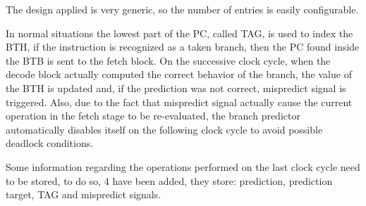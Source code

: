 \documentclass[12pt]{article}
\begin{document}
The design applied is very generic, so the number of entries is easily configurable.

In normal situations the lowest part of the PC, called TAG, is used to index the BTH, if the instruction is recognized as a taken branch, then the PC found inside the BTB is sent to the fetch block. On the successive clock cycle, when the decode block actually computed the correct behavior of the branch, the value of the BTH is updated and, if the prediction was not correct, mispredict signal is triggered.
Also, due to the fact that mispredict signal actually cause the current operation in the fetch stage to be re-evaluated, the branch predictor automatically disables itself on the following clock cycle to avoid possible deadlock conditions.

Some information regarding the operations performed on the last clock cycle need to be stored, to do so, 4 have been added, they store: prediction, prediction target, TAG and mispredict signals.
\end{document}
